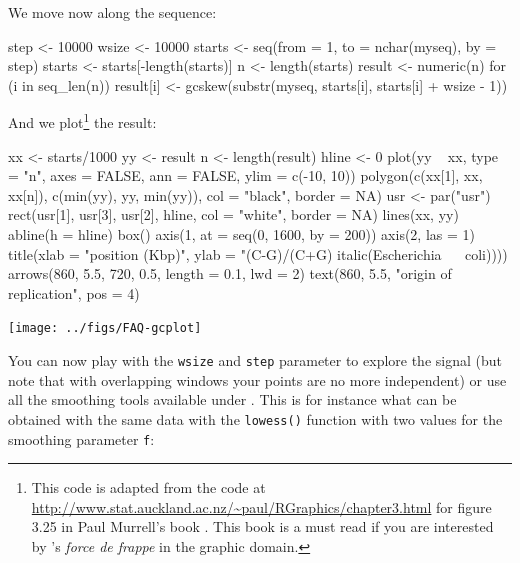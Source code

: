 \documentclass{article}
\begin{document}
We move now along the sequence:

\begin{Schunk}
\begin{Sinput}
 step <- 10000
 wsize <- 10000
 starts <- seq(from = 1, to = nchar(myseq), by = step)
 starts <- starts[-length(starts)]
 n <- length(starts)
 result <- numeric(n)
 for (i in seq_len(n)) {
     result[i] <- gcskew(substr(myseq, starts[i], starts[i] + 
         wsize - 1))
 }
\end{Sinput}
\end{Schunk}

And we plot\footnote{
This code is adapted from the code at \url{http://www.stat.auckland.ac.nz/~paul/RGraphics/chapter3.html} for
figure 3.25 in Paul Murrell's book \cite{MurrellP2005}. This book is a must read if you are interested
by \Rlogo{}'s \textit{force de frappe} in the graphic domain. 
} the result:

\begin{Schunk}
\begin{Sinput}
 xx <- starts/1000
 yy <- result
 n <- length(result)
 hline <- 0
 plot(yy ~ xx, type = "n", axes = FALSE, ann = FALSE, ylim = c(-10, 
     10))
 polygon(c(xx[1], xx, xx[n]), c(min(yy), yy, min(yy)), col = "black", 
     border = NA)
 usr <- par("usr")
 rect(usr[1], usr[3], usr[2], hline, col = "white", border = NA)
 lines(xx, yy)
 abline(h = hline)
 box()
 axis(1, at = seq(0, 1600, by = 200))
 axis(2, las = 1)
 title(xlab = "position (Kbp)", ylab = "(C-G)/(C+G) %
     italic(Escherichia ~ ~coli))))
 arrows(860, 5.5, 720, 0.5, length = 0.1, lwd = 2)
 text(860, 5.5, "origin of replication", pos = 4)
\end{Sinput}
\end{Schunk}

\noindent\texttt{[image: ../figs/FAQ-gcplot]}

You can now play with the \texttt{wsize} and \texttt{step} parameter
to explore the signal (but note that with overlapping windows your
points are no more independent) or use all the smoothing tools
available under \Rlogo{}. This is for instance what can be obtained
with the same data with the \texttt{lowess()} function with two
values for the smoothing parameter \texttt{f}:
\end{document}

